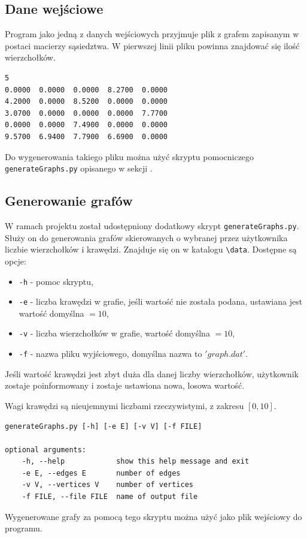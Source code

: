 \documentclass[12pt]{article}
\begin{document}
\subsection{Dane wejściowe}
Program jako jedną z danych wejściowych przyjmuje plik z grafem zapisanym w postaci macierzy sąsiedztwa.
W pierwszej linii pliku powinna znajdować się ilość wierzchołków.

\begin{lstlisting}[caption={Przykładowy graf zapisany w odpowiednim formacie.}, captionpos=b ]
5
0.0000  0.0000  0.0000  8.2700  0.0000
4.2000  0.0000  8.5200  0.0000  0.0000
3.0700  0.0000  0.0000  0.0000  7.7700
0.0000  0.0000  7.4900  0.0000  0.0000
9.5700  6.9400  7.7900  6.6900  0.0000
\end{lstlisting}

Do wygenerowania takiego pliku można użyć skryptu pomocniczego \lstinline|generateGraphs.py| opisanego w sekcji \label{sec:gen_g}.

\subsection{Generowanie grafów} \label{sec:gen_g}
W ramach projektu został udostępniony dodatkowy skrypt  \lstinline|generateGraphs.py|. Służy on do generowania grafów skierowanych o wybranej przez użytkownika liczbie wierzchołków i krawędzi. Znajduje się on w katalogu \lstinline|\data|. Dostępne są opcje:
\begin{itemize}
\item \lstinline|-h| - pomoc skryptu,
\item \lstinline|-e| - liczba krawędzi w grafie, jeśli wartość nie została podana, ustawiana jest wartość domyślna $=10$,
\item \lstinline|-v| - liczba wierzchołków w grafie, wartość domyślna $=10$,
\item \lstinline|-f| - nazwa pliku wyjściowego, domyślna nazwa to $'graph.dat'$.
\end{itemize}

Jeśli wartość krawędzi jest zbyt duża dla danej liczby wierzchołków, użytkownik zostaje poinformowany i zostaje ustawiona nowa, losowa wartość.

Wagi krawędzi są nieujemnymi liczbami rzeczywistymi, z zakresu $[0, 10]$.

\begin{lstlisting}[caption={Pomoc skryptu \lstinline|generateGraphs|.}, captionpos=b ]
generateGraphs.py [-h] [-e E] [-v V] [-f FILE]

optional arguments:
	-h, --help            show this help message and exit
	-e E, --edges E       number of edges
	-v V, --vertices V    number of vertices
	-f FILE, --file FILE  name of output file
\end{lstlisting}

Wygenerowane grafy za pomocą tego skryptu można użyć jako plik wejściowy do programu.
\end{document}
